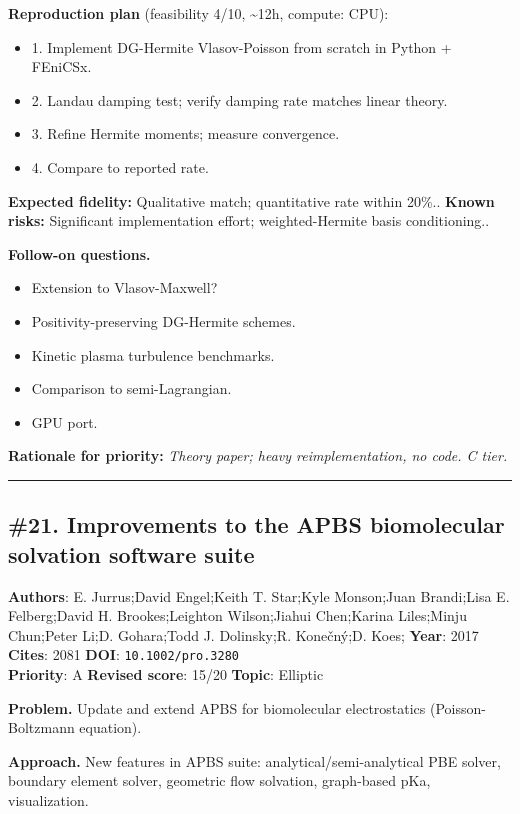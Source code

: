 \documentclass[10pt,letterpaper]{article}
\begin{document}
\textbf{Reproduction plan} (feasibility 4/10, \textasciitilde12h, compute: CPU):
\begin{itemize}
\item 1. Implement DG-Hermite Vlasov-Poisson from scratch in Python + FEniCSx.
\item 2. Landau damping test; verify damping rate matches linear theory.
\item 3. Refine Hermite moments; measure convergence.
\item 4. Compare to reported rate.
\end{itemize}
\textbf{Expected fidelity:} Qualitative match; quantitative rate within 20\%.. \textbf{Known risks:} Significant implementation effort; weighted-Hermite basis conditioning..

\textbf{Follow-on questions.}
\begin{itemize}
\item Extension to Vlasov-Maxwell?
\item Positivity-preserving DG-Hermite schemes.
\item Kinetic plasma turbulence benchmarks.
\item Comparison to semi-Lagrangian.
\item GPU port.
\end{itemize}

\textbf{Rationale for priority:} \emph{Theory paper; heavy reimplementation, no code. C tier.}

\medskip\hrule\medskip

\subsection*{\#21. Improvements to the APBS biomolecular solvation software suite}
\textbf{Authors}: E. Jurrus;David Engel;Keith T. Star;Kyle Monson;Juan Brandi;Lisa E. Felberg;David H. Brookes;Leighton Wilson;Jiahui Chen;Karina Liles;Minju Chun;Peter Li;D. Gohara;Todd J. Dolinsky;R. Konečný;D. Koes; \textbullet{} \textbf{Year}: 2017 \textbullet{} \textbf{Cites}: 2081 \textbullet{} \textbf{DOI}: \texttt{10.1002/pro.3280} \\
\textbf{Priority}: A \textbullet{} \textbf{Revised score}: 15/20 \textbullet{} \textbf{Topic}: Elliptic

\textbf{Problem.} Update and extend APBS for biomolecular electrostatics (Poisson-Boltzmann equation).

\textbf{Approach.} New features in APBS suite: analytical/semi-analytical PBE solver, boundary element solver, geometric flow solvation, graph-based pKa, visualization.
\end{document}
